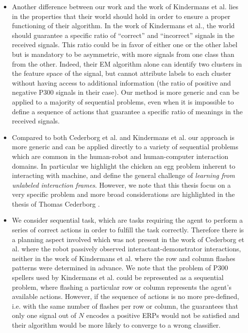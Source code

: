 \begin{itemize}
\item Another difference between our work and the work of Kindermans et al. lies in the properties that their world should hold in order to ensure a proper functioning of their algorithm. In the work of Kindermans et al., the world should guarantee a specific ratio of ``correct'' and ``incorrect'' signals in the received signals. This ratio could be in favor of either one or the other label but is mandatory to be asymmetric, with more signals from one class than from the other. Indeed, their EM algorithm alone can identify two clusters in the feature space of the signal, but cannot attribute labels to each cluster without having access to additional information (the ratio of positive and negative P300 signals in their case). Our method is more generic and can be applied to a majority of sequential problems, even when it is impossible to define a sequence of actions that guarantee a specific ratio of meanings in the received signals. 


\item Compared to both Cederborg et al. and Kindermans et al. our approach is more generic and can be applied directly to a variety of sequential problems which are common in the human-robot and human-computer interaction domains. In particular we highlight the chicken an egg problem inherent to interacting with machine, and define the general challenge of \emph{learning from unlabeled interaction frames}. However, we note that this thesis focus on a very specific problem and more broad considerations are highlighted in the thesis of Thomas Cederborg \cite{cederborg2014thesis}.

\item We consider sequential task, which are tasks requiring the agent to perform a series of correct actions in order to fulfill the task correctly. Therefore there is a planning aspect involved which was not present in the work of Cederborg et al. where the robot passively observed interactant-demonstrator interactions, neither in the work of Kindermans et al. where the row and column flashes patterns were determined in advance. We note that the problem of P300 spellers used by Kindermans et al. could be represented as a sequential problem, where flashing a particular row or column represents the agent's available actions. However, if the sequence of actions is no more pre-defined, i.e. with the same number of flashes per row or column, the guarantees that only one signal out of $N$ encodes a positive ERPs would not be satisfied and their algorithm would be more likely to converge to a wrong classifier.


\end{itemize}

